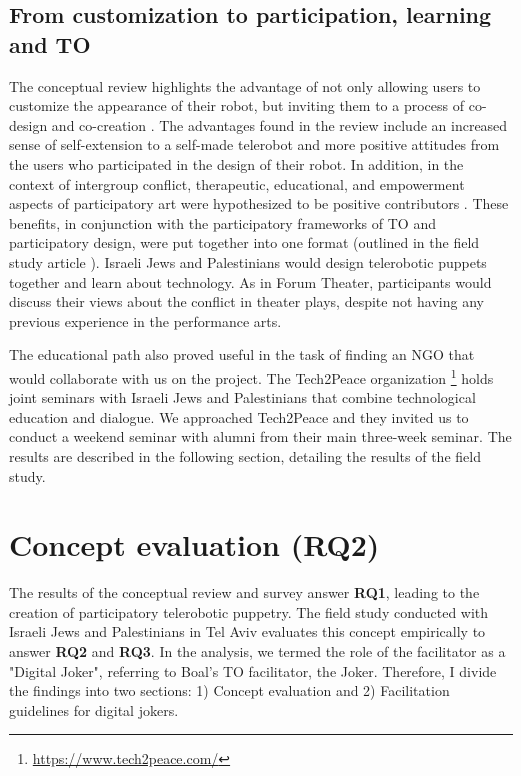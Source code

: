 \documentclass[dissertation,math,vertlayout,pdfa,colorlinks]{aaltoseries}
\begin{document}
\subsection{From customization to participation, learning and TO}
The conceptual review highlights the advantage of not only allowing users to customize the appearance of their robot, but inviting them to a process of co-design and co-creation \cite[p. 80]{peledTelerobotContactHypothesis2022}. The advantages found in the review include an increased sense of self-extension to a self-made telerobot and more positive attitudes from the users who participated in the design of their robot. In addition, in the context of intergroup conflict, therapeutic, educational, and empowerment aspects of participatory art were hypothesized to be positive contributors \cite[p. 80]{peledTelerobotContactHypothesis2022}. These benefits, in conjunction with the participatory frameworks of TO and participatory design, were put together into one format (outlined in the field study article \cite{peledTeleroboticTheaterOppressed2025}). Israeli Jews and Palestinians would design telerobotic puppets together and learn about technology. As in Forum Theater, participants would discuss their views about the conflict in theater plays, despite not having any previous experience in the performance arts.

The educational path also proved useful in the task of finding an NGO that would collaborate with us on the project. The Tech2Peace organization \footnote{\url{https://www.tech2peace.com/}} holds joint seminars with Israeli Jews and Palestinians that combine technological education and dialogue. We approached Tech2Peace and they invited us to conduct a weekend seminar with alumni from their main three-week seminar. The results are described in the following section, detailing the results of the field study.

\section{Concept evaluation (RQ2)}
The results of the conceptual review and survey answer \textbf{RQ1}, leading to the creation of participatory telerobotic puppetry. The field study conducted with Israeli Jews and Palestinians in Tel Aviv evaluates this concept empirically to answer \textbf{RQ2} and \textbf{RQ3}. In the analysis, we termed the role of the facilitator as a "Digital Joker", referring to Boal's TO facilitator, the Joker. Therefore, I divide the findings into two sections: 1) Concept evaluation and 2) Facilitation guidelines for digital jokers.
\end{document}
